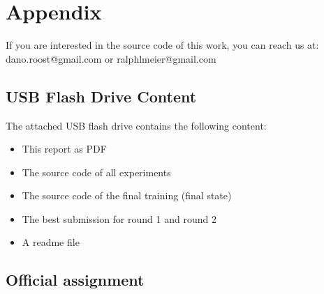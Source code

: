 %
%



\chapter{Appendix}\label{chap.anhang}

If you are interested in the source code of this work, you can reach us at:\\dano.roost@gmail.com or ralphlmeier@gmail.com

\section{USB Flash Drive Content}

The attached USB flash drive contains the following content:
\begin{itemize}
    \item This report as PDF
    \item The source code of all experiments
    \item The source code of the final training (final state)
    \item The best submission for round 1 and round 2
    \item A readme file
\end{itemize}

\section{Official assignment}



\NewPage